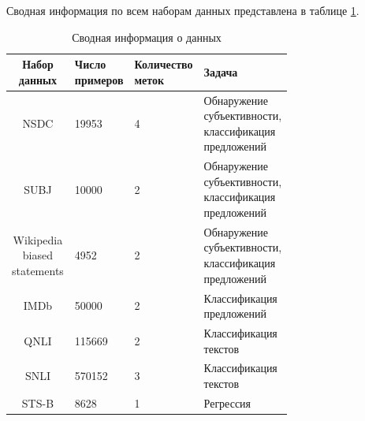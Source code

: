 \documentclass[conference]{IEEEtran}
\begin{document}
Сводная информация по всем наборам данных представлена в таблице \ref{tab:datasets}.
\begin{table}[h!]
    \begin{center}
        \begin{tabular}{|c|l|l|l|}
            \hline
            \thead{Набор \\ данных} & \thead{Число \\ примеров} & \thead{Количество \\ меток} & Задача \\ \hline
            NSDC & 19953 & 4 & \makecell[l]{Обнаружение \\ субъективности, \\ классификация \\ предложений} \\ \hline
            SUBJ & 10000 & 2 &  \makecell[l]{Обнаружение \\ субъективности, \\ классификация \\ предложений} \\ \hline
            \makecell{Wikipedia \\ biased \\ statements} & 4952 & 2 & \makecell[l]{Обнаружение \\ субъективности, \\ классификация \\ предложений} \\ \hline
            IMDb & 50000 & 2 & \makecell[l]{Классификация \\ предложений}  \\ \hline
            QNLI & 115669 & 2 & \makecell[l]{Классификация \\ текстов} \\ \hline
            SNLI & 570152 & 3 & \makecell[l]{Классификация \\ текстов} \\ \hline
            STS-B & 8628 & 1 & Регрессия \\ \hline
        \end{tabular}
        \caption{Сводная информация о данных}
        \label{tab:datasets}    
    \end{center}
\end{table}
\end{document}

